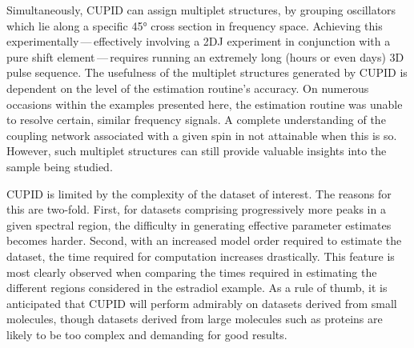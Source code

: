 Simultaneously, \ac{CUPID} can assign multiplet structures,
by grouping oscillators which lie along a specific \ang{45} cross section in
frequency space. Achieving this experimentally\,---\,effectively involving
a \ac{2DJ} experiment in conjunction with a pure shift element\,---\,requires
running an extremely long (hours or even days) \ac{3D} pulse sequence. The
usefulness of the multiplet structures generated by \ac{CUPID} is dependent on
the level of the estimation routine's accuracy. On
numerous occasions within the examples presented here, the estimation routine
was unable to resolve certain, similar frequency signals. A complete
understanding of the coupling network associated with a given spin in not
attainable when this is so. However, such multiplet structures can still provide
valuable insights into the sample being studied.

\ac{CUPID} is limited by the complexity of the dataset of interest. The reasons
for this are two-fold. First, for datasets comprising progressively more peaks
in a given spectral region, the difficulty in generating effective parameter
estimates becomes harder. Second, with an increased model order required to
estimate the dataset, the time required for computation increases drastically.
This feature is most clearly observed when comparing the times required in
estimating the different regions considered in the estradiol example. As a rule
of thumb, it is anticipated that \ac{CUPID} will perform admirably on datasets
derived from small molecules, though datasets derived from large molecules such
as proteins are likely to be too complex and demanding for good results.
